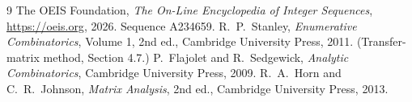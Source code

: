 \documentclass[11pt,a4paper]{article}
\theoremstyle{plain}
\theoremstyle{definition}
\begin{document}
\begin{thebibliography}{9}
 The OEIS Foundation, \emph{The On-Line Encyclopedia of Integer
Sequences}, \url{https://oeis.org}, 2026. Sequence A234659.
 R.~P.~Stanley, \emph{Enumerative Combinatorics}, Volume 1, 2nd ed.,
Cambridge University Press, 2011. (Transfer-matrix method, Section 4.7.)
 P.~Flajolet and R.~Sedgewick, \emph{Analytic Combinatorics}, Cambridge
University Press, 2009.
 R.~A.~Horn and C.~R.~Johnson, \emph{Matrix Analysis}, 2nd ed., Cambridge
University Press, 2013.
\end{thebibliography}
\end{document}

